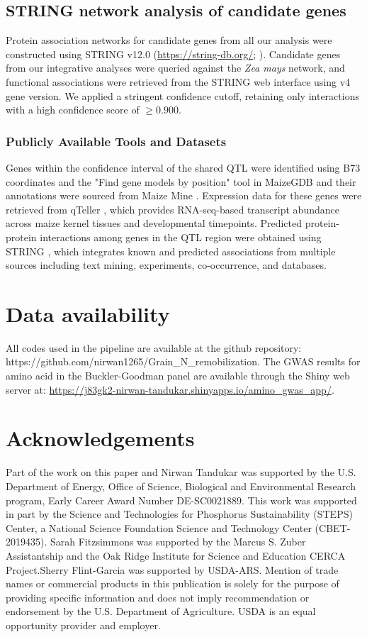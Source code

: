 \subsection{STRING network analysis of candidate genes}

Protein association networks for candidate genes from all our analysis were constructed using STRING v12.0 (\url{https://string-db.org/}; \citealp{Szklarczyk2023STRING}). Candidate genes from our integrative analyses were queried against the \textit{Zea mays} network, and functional associations were retrieved from the STRING web interface using v4 gene version. We applied a stringent confidence cutoff, retaining only interactions with a high confidence score of $\geq 0.900$. 


\subsubsection{Publicly Available Tools and Datasets}
Genes within the confidence interval of the shared QTL were identified using B73 coordinates and the "Find gene models by position" tool in MaizeGDB \citep{MaizeGDB} and their annotations were sourced from Maize Mine \citep{maizemine}. Expression data for these genes were retrieved from qTeller \citep{qteller}, which provides RNA-seq-based transcript abundance across maize kernel tissues and developmental timepoints. Predicted protein-protein interactions among genes in the QTL region were obtained using STRING \citep{STRING}, which integrates known and predicted associations from multiple sources including text mining, experiments, co-occurrence, and databases.

\section{Data availability}
All codes used in the pipeline are available at the github repository: https://github.com/nirwan1265/Grain\_N\_remobilization. The GWAS results for amino acid in the Buckler-Goodman panel are available through the Shiny web server at:
\url{https://j83gk2-nirwan-tandukar.shinyapps.io/amino_gwas_app/}.


\section{Acknowledgements}

Part of the work on this paper and Nirwan Tandukar was supported by the U.S. Department of Energy, Office of Science, Biological and Environmental Research program, Early Career Award Number DE-SC0021889.
This work was supported in part by the Science and Technologies for Phosphorus Sustainability (STEPS) Center, a National Science Foundation Science and Technology Center (CBET-2019435). Sarah Fitzsimmons was supported by the Marcus S. Zuber Assistantship and the Oak Ridge Institute for Science and Education CERCA Project.Sherry Flint-Garcia was supported by USDA-ARS. Mention of trade names or commercial products in this publication is solely for the purpose of providing specific information and does not imply recommendation or endorsement by the U.S. Department of Agriculture. USDA is an equal opportunity provider and employer.

